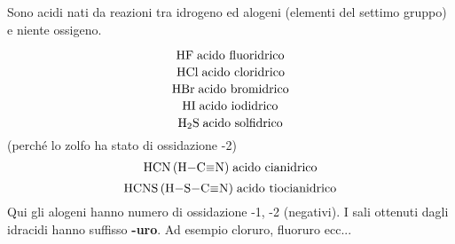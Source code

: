 Sono acidi nati da reazioni tra idrogeno ed alogeni (elementi del settimo gruppo) e niente ossigeno.

$$\ce{HF} \; \text{acido fluoridrico}$$
$$\ce{HCl} \; \text{acido cloridrico}$$
$$\ce{HBr} \; \text{acido bromidrico}$$
$$\ce{HI} \; \text{acido iodidrico}$$
$$\ce{H_2S} \; \text{acido solfidrico}$$
\hspace{+4cm}(perché lo zolfo ha stato di ossidazione -2)
$$\ce{HCN (H-C#N)} \; \text{acido cianidrico}$$
$$\ce{HCNS (H-S-C#N)} \; \text{acido tiocianidrico}$$
Qui gli alogeni hanno numero di ossidazione -1, -2 (negativi). I sali ottenuti dagli idracidi hanno suffisso \textbf{-uro}. Ad esempio cloruro, fluoruro ecc...